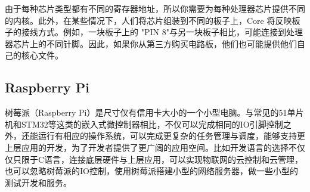 \documentclass[scheme=chinese,a4paper]{article}
\begin{document}
由于每种芯片类型都有不同的寄存器地址，所以你需要为每种处理器芯片提供不同的内核。此外，在某些情况下，人们将芯片组装到不同的板子上，Core 将反映板子的接线方式。例如，一块板子上的 "PIN 8"与另一块板子相比，可能连接到处理器芯片上的不同针脚。因此，如果你从第三方购买电路板，他们也可能提供他们自己的核心文件。
\subsection{Raspberry Pi}
树莓派（Raspberry Pi）是尺寸仅有信用卡大小的一个小型电脑。\cite{wiki:raspberry_pi}与常见的51单片机和STM32等这类的嵌入式微控制器相比，不仅可以完成相同的IO引脚控制之外，还能运行有相应的操作系统，可以完成更复杂的任务管理与调度，能够支持更上层应用的开发，为了开发者提供了更广阔的应用空间。比如开发语言的选择不仅仅只限于C语言，连接底层硬件与上层应用，可以实现物联网的云控制和云管理，也可以忽略树莓派的IO控制，使用树莓派搭建小型的网络服务器，做一些小型的测试开发和服务。
\end{document}
